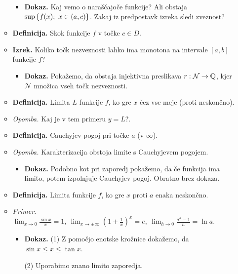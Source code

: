 \begin{enumerate}
\begin{itemize}
        \begin{itemize}
            \item \colorbox{green!30}{\textbf{Dokaz.}} Kaj vemo o naraščajoče funkcije? Ali obstaja $\sup \left\{f(x); \ x \in (a,c)\right\}$. Zakaj iz predpostavk izreka sledi zveznost?
        \end{itemize}
        \item \colorbox{purple!30}{\textbf{Definicija.}} Skok funkcije $f$ v točke $c \in D$.
        \item \colorbox{blue!30}{\textbf{Izrek.}} Koliko točk nezveznosti lahko ima monotona na intervale $[a,b]$ funkcije $f$?
        \begin{itemize}
            \item \colorbox{green!30}{\textbf{Dokaz.}} Pokažemo, da obstaja injektivna preslikava $r: \mathcal{N} \to \mathbb{Q}$, kjer $\mathcal{N}$ množica vseh točk nezveznosti.
        \end{itemize}
        \item \colorbox{purple!30}{\textbf{Definicija.}} Limita $L$ funkcije $f$, ko gre $x$ čez vse meje (proti neskončno).
        \item \colorbox{yellow!30}{\emph{Opomba.}} Kaj je v tem primeru $y = L$?.
        \item \colorbox{purple!30}{\textbf{Definicija.}} Cauchyjev pogoj pri točke $a$ (v $\infty$).
        \item \colorbox{yellow!30}{\emph{Opomba.}} Karakterizacija obstoja limite s Cauchyjevem pogojem.
        \begin{itemize}
            \item \colorbox{green!30}{\textbf{Dokaz.}} Podobno kot pri zaporedj pokažemo, da če funkcija ima limito, potem izpolnjuje Cauchyjev pogoj. Obratno brez dokaza.
        \end{itemize}
        \item \colorbox{purple!30}{\textbf{Definicija.}} Limita funkcije $f$, ko gre $x$ proti $a$ enaka neskončno.
        \item \colorbox{yellow!30}{\emph{Primer.}} $\displaystyle \lim_{x \to 0} \frac{\sin x}{x}=1, \ \lim_{x \to \pm \infty} (1+\frac{1}{x})^x=e, \ \lim_{h \to 0} \frac{a^h-1}{h} = \ln a$.
        \begin{itemize}
            \item \colorbox{green!30}{\textbf{Dokaz.}} (1) Z pomočjo enotske krožnice dokažemo, da $\sin x \leq x \leq \tan x$.
            
            (2) Uporabimo znano limito zaporedja.


\end{itemize}
\end{itemize}
\end{enumerate}
